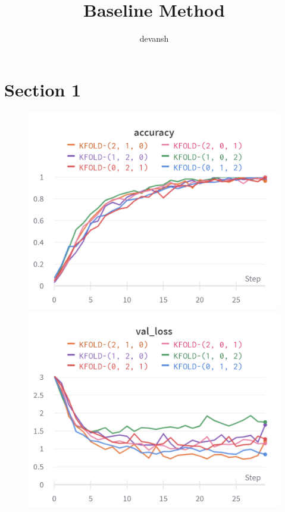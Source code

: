 \documentclass{article}
\title{Baseline Method}
\author{%
devansh
}
\begin{document}
\maketitle

\section{Section 1}

\begin{figure}[!htb]
\includegraphics[width=\linewidth]{charts/Section-2-Panel-0-bktx111zt}
\caption{}
\endminipage\hfill
{}
\includegraphics[width=\linewidth]{charts/Section-2-Panel-1-dvjr1ljh0}
\caption{}
\endminipage
\end{figure}
\end{document}
